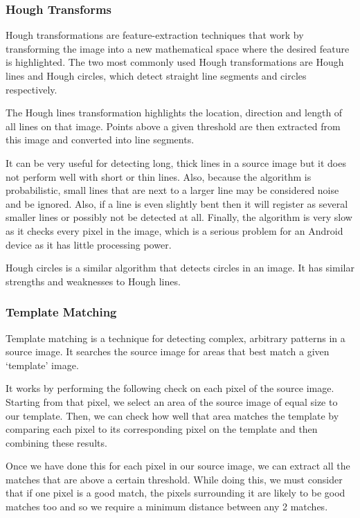 \subsubsection{Hough Transforms}

Hough transformations are feature-extraction techniques that work by transforming the image into a new mathematical space where the desired feature is highlighted. The two most commonly used Hough transformations are Hough lines and Hough circles, which detect straight line segments and circles respectively.

The Hough lines transformation highlights the location, direction and length of all lines on that image. Points above a given threshold are then extracted from this image and converted into line segments.

It can be very useful for detecting long, thick lines in a source image but it does not perform well with short or thin lines. Also, because the algorithm is probabilistic, small lines that are next to a larger line may be considered noise and be ignored. Also, if a line is even slightly bent then it will register as several smaller lines or possibly not be detected at all. Finally, the algorithm is very slow as it checks every pixel in the
image, which is a serious problem for an Android device as it has little processing power.

Hough circles is a similar algorithm that detects circles in an image. It has similar strengths and weaknesses to Hough lines.

\subsubsection{Template Matching}

Template matching is a technique for detecting complex, arbitrary patterns in a source image. It searches the source image for areas that best match a given ‘template’ image.

It works by performing the following check on each pixel of the source image. Starting from that pixel, we select an area of the source image of equal size to our template. Then, we can check how well that area matches the template by comparing each pixel to its corresponding pixel on the template and then combining these results. 

Once we have done this for each pixel in our source image, we can extract all the matches that are above a certain threshold. While doing this, we must consider that if one pixel is a good match, the pixels surrounding it are likely to be good matches too and so we require a minimum distance between any 2 matches.
    
